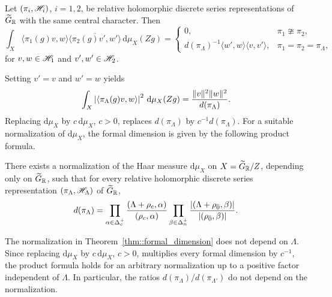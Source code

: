 \begin{proposition}
\label{prop::orthogonality_relations}
Let $(\pi_i,{\mathscr{H}}_i)$, $i=1,2$, be relative holomorphic discrete series representations of $\widetilde{G}_{{\mathbb R}}$ with the same central character. Then
\[
\int_X
\langle\pi_1(g)v,w\rangle
\overline{\langle\pi_2(g)v',w'\rangle}
\,\mathrm{d}\mu_X(Zg)
=
\begin{cases}
0, & \pi_1\ncong\pi_2,\\ d(\pi_\Lambda)^{-1}\langle w',w\rangle\langle v,v'\rangle,
& \pi_1=\pi_2=\pi_\Lambda,
\end{cases}
\]
for $v,w\in{\mathscr{H}}_1$ and $v',w'\in{\mathscr{H}}_2$.
\end{proposition}

Setting $v'=v$ and $w'=w$ yields
\begin{equation}
\int_X
\left|{\langle\pi_\Lambda(g)v,w\rangle}\right|^{2}
\,\mathrm{d}\mu_X(Zg)
=
\frac{\lVert v\rVert^{2}\lVert w\rVert^{2}}{d(\pi_\Lambda)}.
\end{equation}
Replacing $\mathrm{d}\mu_X$ by $c\,\mathrm{d}\mu_X$, $c>0$, replaces
$d(\pi_\Lambda)$ by $c^{-1}d(\pi_\Lambda)$. For a suitable normalization
of $\mathrm{d}\mu_X$, the formal dimension is given by the following
product formula.

\begin{theorem}
\label{thm::formal_dimension}
There exists a normalization of the Haar measure $\mathrm{d}\mu_X$ on
$X=\widetilde{G}_{{\mathbb R}}/Z$, depending only on $\widetilde{G}_{{\mathbb R}}$, such that
for every relative holomorphic discrete series representation
$(\pi_{\Lambda},{\mathscr{H}}_{\Lambda})$ of $\widetilde{G}_{{\mathbb R}}$,
\begin{equation*}
d(\pi_{\Lambda})
=
\prod_{\alpha\in\Delta_{c}^{+}}
\frac{(\Lambda+\rho_{c},\alpha)}
     {(\rho_{c},\alpha)}
\prod_{\beta\in\Delta_{n}^{+}}
\frac{\left|{(\Lambda+\rho_{\bar0},\beta)}\right|}
     {\left|{(\rho_{\bar0},\beta)}\right|}.
\end{equation*}
\end{theorem}

\begin{remark}
The normalization in Theorem~\ref{thm::formal_dimension} does not depend on $\Lambda$. Since replacing $\mathrm{d}\mu_X$ by $c\,\mathrm{d}\mu_X$, $c>0$, multiplies every formal dimension by $c^{-1}$, the product formula holds for an arbitrary normalization up to a positive factor independent of $\Lambda$. In particular, the ratios $d(\pi_{\Lambda})/d(\pi_{\Lambda'})$ do not depend on the normalization.
\end{remark}


